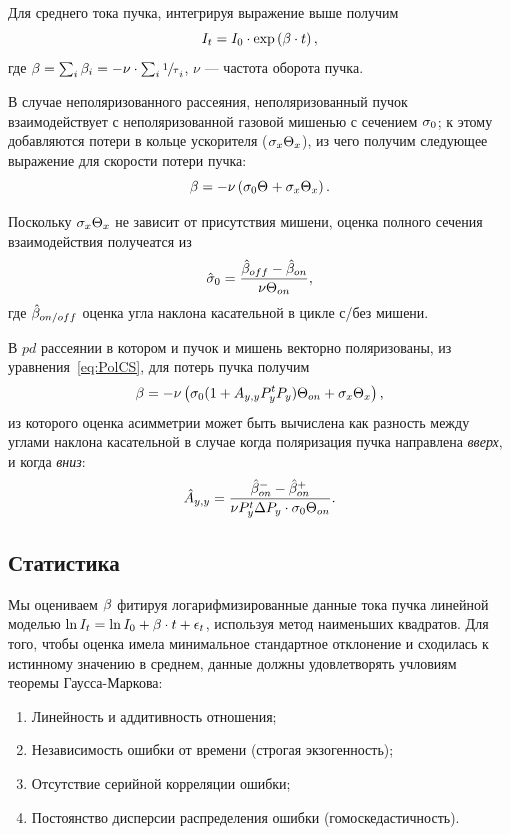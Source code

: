 \documentclass{article}
\begin{document}
	Для среднего тока пучка, интегрируя выражение выше получим
	\begin{equation}\label{eq:CurrentDecay}
	I_t = I_0 \cdot \exp\bkt{\slp\cdot t},
	\end{equation}
	где $\slp = \sum_i \slp[i] = - \nu\cdot\sum_i \sfrac1\tau_i$, $\nu$ --- частота оборота пучка. 
	
	В случае неполяризованного рассеяния, неполяризованный пучок взаимодействует с неполяризованной газовой мишенью с сечением $\CS[0]$; к этому добавляются потери в кольце ускорителя ($\CS[x]\Thick[x]$), из чего получим следующее выражение для скорости потери пучка:
	\begin{equation}\label{eq:SlopeModel}
	\slp = -\nu\bkt{\CS[0]\Thick + \CS[x]\Thick[x]}.
	\end{equation}
	
	Поскольку $\CS[x]\Thick[x]$ не зависит от присутствия мишени, оценка полного сечения взаимодействия получеатся из
	\begin{equation}
	\CS*[0] = \frac{\slp*[off] - \slp*[on]}{\nu\Thick[on]},
	\end{equation}
	где $\slp*[on/off]$ оценка угла наклона касательной в цикле с/без мишени.
	
	В $pd$ рассеянии в котором и пучок и мишень векторно поляризованы, из уравнения~\eqref{eq:PolCS}, для потерь пучка получим
	\[
	\slp = -\nu\bkt{\CS[0](1 + \Ayy P_y^t P_y)\Thick[on] + \CS[x]\Thick[x]},
	\]
	из которого оценка асимметрии может быть вычислена как разность между углами наклона касательной в случае когда поляризация пучка направлена \emph{вверх}, и когда \emph{вниз}:
	\begin{equation}\label{eq:AyyEst}
	\Ayy* = \frac{\slp*[on]^- - \slp*[on]^+}{\nu P_y^t\Delta P_y\cdot \CS[0]\Thick[on]}.
	\end{equation}
	
	\subsection{Статистика}\label{sec:StatQuest}
	
	Мы оцениваем $\slp$ фитируя логарифмизированные данные тока пучка линейной моделью $\ln I_t = \ln I_0 + \slp\cdot t + \epsilon_t$, используя метод наименьших квадратов. Для того, чтобы оценка имела минимальное стандартное отклонение и сходилась к истинному значению в среднем, данные должны удовлетворять учловиям теоремы Гаусса-Маркова: %
	\begin{enumerate}
		\item Линейность и аддитивность отношения;
		\item Независимость ошибки от времени (строгая экзогенность);
		\item Отсутствие серийной корреляции ошибки;
		\item Постоянство дисперсии распределения ошибки (гомоскедастичность).
	\end{enumerate}
	
\end{document}
